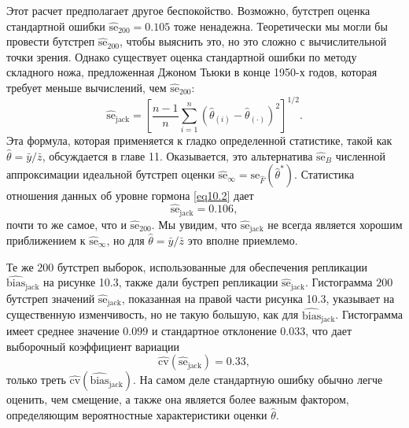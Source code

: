 Этот расчет предполагает другое беспокойство. Возможно, бутстреп оценка стандартной ошибки $\widehat{\text{se}}_{200} = 0.105$ тоже ненадежна. Теоретически мы могли бы провести бутстреп $\widehat{\text{se}}_{200}$, чтобы выяснить это, но это сложно с вычислительной точки зрения. Однако существует оценка стандартной ошибки по методу складного ножа, предложенная Джоном Тьюки в конце 1950-х годов, которая требует меньше вычислений, чем $\widehat{\text{se}}_{200}$:
\begin{equation}\label{eq10.34}
    \widehat{\text{se}}_{\text{jack}} = \left[\frac{n-1}{n}\sum\limits_{i=1}^{n}(\hat{\theta}_{(i)} - \hat{\theta}_{(\cdot)})^{2}\right]^{1/2}.
\end{equation}
Эта формула, которая применяется к гладко определенной статистике, такой как $\hat{\theta} = \bar{y}/\bar{z}$, обсуждается в главе 11. Оказывается, это альтернатива $\widehat{\text{se}}_{B}$ численной аппроксимации идеальной бутстреп оценки $\widehat{\text{se}}_{\infty} = \text{se}_{\hat{F}}(\hat{\theta}^{*})$. Статистика отношения данных об уровне гормона \ref{eq10.2} дает
\begin{equation}\label{eq10.35}
   \widehat{\text{se}}_{\text{jack}} = 0.106,
\end{equation}
почти то же самое, что и $\widehat{\text{se}}_{200}$. Мы увидим, что $\widehat{\text{se}}_{\text{jack}}$ не всегда является хорошим приближением к $\widehat{\text{se}}_{\infty}$, но для $\hat{\theta} = \bar{y}/\bar{z}$ это вполне приемлемо.

Те же $200$ бутстреп выборок, использованные для обеспечения репликации $\widehat{\text{bias}}_{\text{jack}}$ на рисунке 10.3, также дали бустреп репликации $\widehat{\text{se}}_{\text{jack}}$. Гистограмма $200$ бутстреп значений  $\widehat{\text{se}}_{\text{jack}}$, показанная на правой части рисунка 10.3, указывает на существенную изменчивость, но не такую большую, как для $\widehat{\text{bias}}_{\text{jack}}$. Гистограмма имеет среднее значение $0.099$ и стандартное отклонение $0.033$, что дает выборочный коэффициент вариации
\begin{equation}\label{eq10.36}
   \widehat{\text{cv}}(\widehat{\text{se}}_{\text{jack}}) = 0.33,
\end{equation}
только треть $\widehat{\text{cv}}(\widehat{\text{bias}}_{\text{jack}})$. На самом деле стандартную ошибку обычно легче оценить, чем смещение, а также она является более важным фактором, определяющим вероятностные характеристики оценки $\hat{\theta}$.

